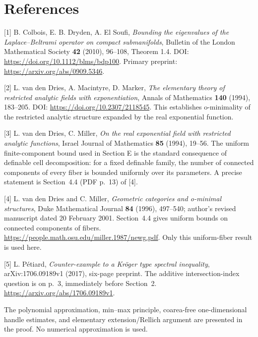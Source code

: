 \documentclass[11pt,a4paper]{article}
\begin{document}
\hypertarget{1022-references}{%
\section{References}\label{1022-references}}

{[}1{]} B. Colbois, E. B. Dryden, A. El Soufi, \emph{Bounding the
eigenvalues of the Laplace--Beltrami operator on compact submanifolds},
Bulletin of the London Mathematical Society \textbf{42} (2010), 96--108,
Theorem 1.4. DOI: \url{https://doi.org/10.1112/blms/bdp100}. Primary
preprint: \url{https://arxiv.org/abs/0909.5346}.

{[}2{]} L. van den Dries, A. Macintyre, D. Marker, \emph{The elementary
theory of restricted analytic fields with exponentiation}, Annals of
Mathematics \textbf{140} (1994), 183--205. DOI:
\url{https://doi.org/10.2307/2118545}. This establishes o-minimality of
the restricted analytic structure expanded by the real exponential
function.

{[}3{]} L. van den Dries, C. Miller, \emph{On the real exponential field
with restricted analytic functions}, Israel Journal of Mathematics
\textbf{85} (1994), 19--56. The uniform finite-component bound used in
Section E is the standard consequence of definable cell decomposition:
for a fixed definable family, the number of connected components of
every fiber is bounded uniformly over its parameters. A precise statement
is Section~4.4 (PDF p.~13) of [4].


{[}4{]} L. van den Dries and C. Miller,
\emph{Geometric categories and o-minimal structures},
Duke Mathematical Journal \textbf{84} (1996), 497--540;
author's revised manuscript dated 20 February 2001.
Section~4.4 gives uniform bounds on connected components of fibers.
\url{https://people.math.osu.edu/miller.1987/newg.pdf}.
Only this uniform-fiber result is used here.


{[}5{]} L. P\'etiard, \emph{Counter-example to a Kr\"oger type spectral inequality},
arXiv:1706.09189v1 (2017), six-page preprint.
The additive intersection-index question is on p.~3, immediately before
Section~2.
\url{https://arxiv.org/abs/1706.09189v1}.

The polynomial approximation, min--max principle, coarea-free
one-dimensional handle estimates, and elementary extension/Rellich
argument are presented in the proof. No numerical approximation is used.
\end{document}
